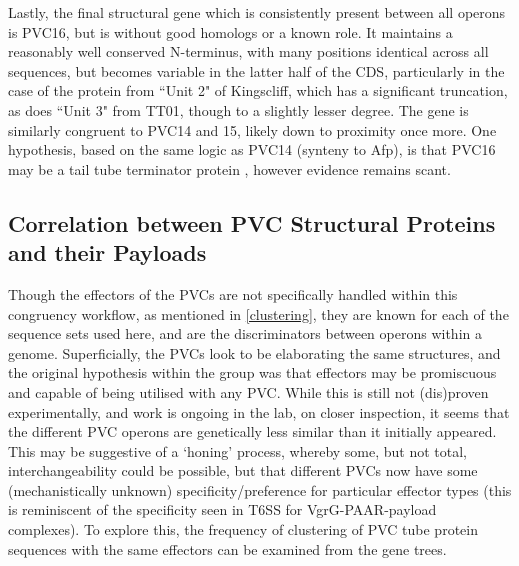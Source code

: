 Lastly, the final structural gene which is consistently present between all operons is PVC16, but is without good homologs or a known role. It maintains a reasonably well conserved N-terminus, with many positions identical across all sequences, but becomes variable in the latter half of the CDS, particularly in the case of the protein from ``Unit 2" of Kingscliff, which has a significant truncation, as does ``Unit 3" from TT01, though to a slightly lesser degree. The gene is similarly congruent to PVC14 and 15, likely down to proximity once more. One hypothesis, based on the same logic as PVC14 (synteny to Afp), is that PVC16 may be a tail tube terminator protein \citep{Rybakova2013}, however evidence remains scant.

\subsection{Correlation between PVC Structural Proteins and their Payloads}
Though the effectors of the PVCs are not specifically handled within this congruency workflow, as mentioned in \vref{clustering}, they are known for each of the sequence sets used here, and are the discriminators between operons within a genome. Superficially, the PVCs look to be elaborating the same structures, and the original hypothesis within the group was that effectors may be promiscuous and capable of being utilised with any PVC. While this is still not (dis)proven experimentally, and work is ongoing in the lab, on closer inspection, it seems that the different PVC operons are genetically less similar than it initially appeared. This may be suggestive of a `honing' process, whereby some, but not total, interchangeability could be possible, but that different PVCs now have some (mechanistically unknown) specificity/preference for particular effector types (this is reminiscent of the specificity seen in T6SS for VgrG-PAAR-payload complexes). To explore this, the frequency of clustering of PVC tube protein sequences with the same effectors can be examined from the gene trees.
 
